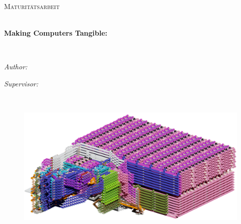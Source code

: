 \documentclass[
11pt, %
english, %
singlespacing, %
headsepline, %
]{Thesis} %
\author{Damian \textsc{O'Dell}} %
\begin{document}
\frontmatter %

\pagestyle{plain} %


\begin{titlepage}
\begin{center}

\vspace*{.03\textheight}
{\scshape\LARGE \univname\par}\vspace{1.5cm} %
\textsc{\Large Maturitätsarbeit}\\[0.5cm] %

\HRule \\[0.4cm] %
{\huge \bfseries Making Computers Tangible:\\\ttitle\par}\vspace{0.4cm} %
\HRule \\[1.5cm] %
 
\begin{minipage}[t]{0.4\textwidth}
\begin{flushleft} \large
\emph{Author:}\\
\authorname %
\end{flushleft}
\end{minipage}
\begin{minipage}[t]{0.4\textwidth}
\begin{flushright} \large
\emph{Supervisor:} \\
\supname %
\end{flushright}
\end{minipage}\\[0.01cm]

\begin{figure}[h!]
	\begin{center}
		\hspace*{-0.4cm}\includegraphics[width=1.1\textwidth]{Figures/CPU-FullShot-small.png}
	\end{center}
\end{figure}


\end{center}
\end{titlepage}
\end{document}
